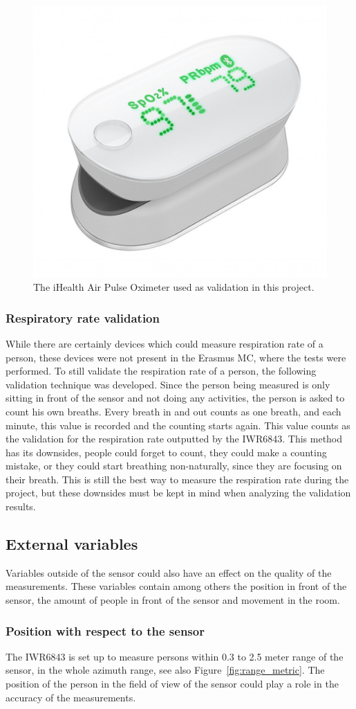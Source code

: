 \begin{figure}[t]
    \centering
    \includegraphics[width=.4\textwidth]{figures/validation/ihealth.jpg}
    \caption{The iHealth Air Pulse Oximeter used as validation in this project.}
    \label{fig:ihealth}
\end{figure}

\subsubsection{Respiratory rate validation}
While there are certainly devices which could measure respiration rate of a person, these devices were not present in the Erasmus MC, where the tests were performed. To still validate the respiration rate of a person, the following validation technique was developed. Since the person being measured is only sitting in front of the sensor and not doing any activities, the person is asked to count his own breaths. Every breath in and out counts as one breath, and each minute, this value is recorded and the counting starts again. This value counts as the validation for the respiration rate outputted by the IWR6843. This method has its downsides, people could forget to count, they could make a counting mistake, or they could start breathing non-naturally, since they are focusing on their breath. This is still the best way to measure the respiration rate during the project, but these downsides must be kept in mind when analyzing the validation results.

\subsection{External variables}
Variables outside of the sensor could also have an effect on the quality of the measurements. These variables contain among others the position in front of the sensor, the amount of people in front of the sensor and movement in the room.

\subsubsection{Position with respect to the sensor}
The IWR6843 is set up to measure persons within 0.3 to 2.5 meter range of the sensor, in the whole azimuth range, see also Figure~\ref{fig:range_metric}. The position of the person in the field of view of the sensor could play a role in the accuracy of the measurements.


